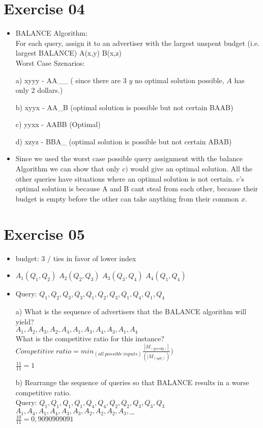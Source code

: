 \documentclass[11pt,a4paper]{scrartcl}
\begin{document}
\section*{Exercise 04}
\begin{itemize}
	\item BALANCE Algorithm:\\
		For each query, assign it to an advertiser with the
		largest unspent budget (i.e. largest BALANCE) A(x,y) B(x,z)\\
		Worst Case Szenarios:

	\item[a)] xyyy - AA\_\_ ( since there are 3 $y$ no optimal solution possible, $A$ has only 2 dollars.)
	
	\item[b)] xyyx - AA\_B (optimal solution is possible but not certain BAAB)
	
	\item[c)] yyxx - AABB (Optimal)
	
	\item[d)] xzyz - BBA\_ (optimal solution is possible but not certain ABAB)
	
	\item Since we used the worst case possible query assignment with the balance Algorithm we can show that only $c)$ 			would give an optimal solution. All the other queries have situations where an optimal solution is not certain.
		$c$'s optimal solution is because A and B cant steal from each other, because their budget is empty before the other 		can take anything from their common $x$.
		
\end{itemize} 

\section*{Exercise 05}
\begin{itemize}
	\item budget: 3 / ties in favor of lower index
	\item $A_1(Q_1,Q_2)$ $A_2(Q_2,Q_3)$ $A_3(Q_3,Q_4)$ $A_4(Q_1,Q_4)$
	\item Query: $Q_1, Q_2, Q_3, Q_3, Q_1, Q_2, Q_3, Q_1, Q_4, Q_1, Q_4$

	\item[a)] What is the sequence of advertisers that the BALANCE algorithm will yield? \\
			$A_1,A_2,A_3,A_2,A_4,A_1,A_3,A_4,A_3,A_1,A_4$\\
	What is the competitive ratio for this instance?\\
	$Competitive\ ratio = min_(all\ possible\ inputs)\frac{|M_(greedy)|}{(|M_(opt|))})$\\
	$\frac{11}{11} = 1$
	
	\item[b)] Rearrange the sequence of queries so that BALANCE results in a worse competitive ratio.\\
		Query: $Q_1, Q_1, Q_1, Q_1, Q_4, Q_4, Q_2, Q_2, Q_3, Q_3, Q_3$\\
		$A_1,A_4,A_1,A_4,A_3,A_3,A_2,A_2,A_2,A_3, \_\_$\\
		$\frac{10}{11} = 0,9090909091$
\end{itemize} 	
	
\end{document}
